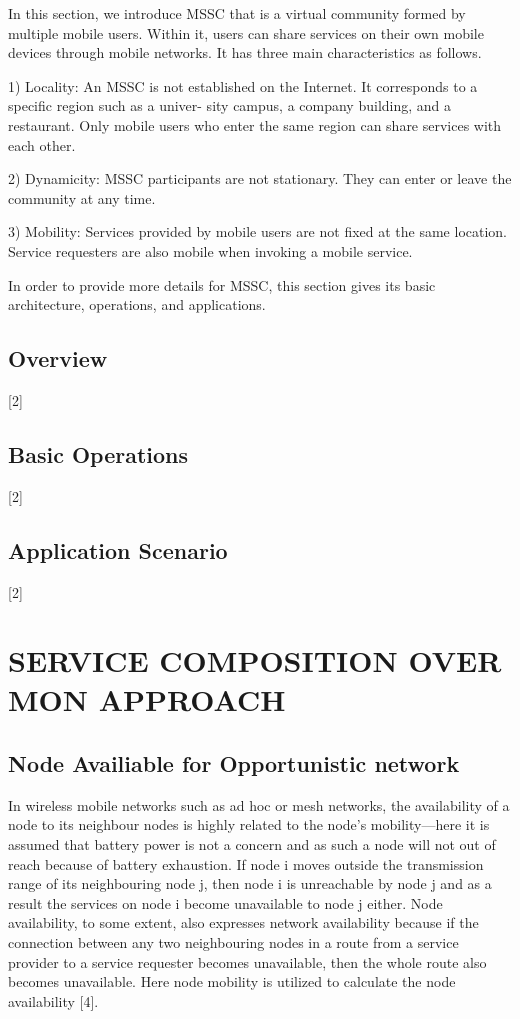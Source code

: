 \documentclass[10pt,journal,compsoc]{IEEEtran}
\begin{document}
In this section, we introduce MSSC that is a virtual community formed by multiple mobile users. Within it, users can share services on their own mobile devices through mobile networks. It has three main characteristics as follows.

1) Locality: An MSSC is not established on the Internet. It corresponds to a specific region such as a univer- sity campus, a company building, and a restaurant. Only mobile users who enter the same region can share services with each other.

2) Dynamicity: MSSC participants are not stationary. They can enter or leave the community at any time.

3) Mobility: Services provided by mobile users are not fixed at the same location. Service requesters are also mobile when invoking a mobile service.

In order to provide more details for MSSC, this section gives its basic architecture, operations, and applications.
\subsection{Overview}
[2]
\subsection{Basic Operations}
[2]
\subsection{Application Scenario}
[2]

\section{SERVICE COMPOSITION OVER MON APPROACH}
\subsection{Node Availiable for Opportunistic network}
In wireless mobile networks such as ad hoc or mesh networks, the availability of a node to its neighbour nodes is highly related to the node’s mobility—here it is assumed that battery power is not a concern and as such a node will not out of reach because of battery exhaustion. If node i moves outside the transmission range of its neighbouring node j, then node i is unreachable by node j and as a result the services on node i become unavailable to node j either. Node availability, to some extent, also expresses network availability because if the connection between any two neighbouring nodes in a route from a service provider to a service requester becomes unavailable, then the whole route also becomes unavailable. Here node mobility is utilized to calculate the node availability [4].
\end{document}
